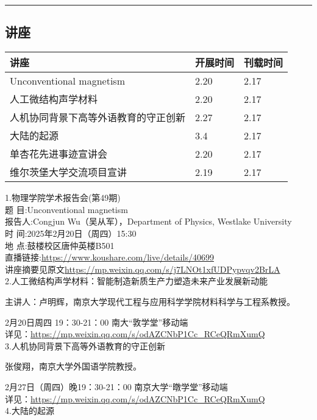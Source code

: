 \documentclass[letterpaper, 12pt]{article}
\begin{document}
\hrule
\pagebreak
\begin{multicols}{2}

\section{讲座}
\begin{tabularx}{0.5\textwidth}{|X|X|X|}
    \hline
    讲座 & 开展时间 & 刊载时间\\
    \hline\hline
Unconventional magnetism & 2.20 & 2.17\\\hline
人工微结构声学材料 & 2.20 & 2.17\\\hline
人机协同背景下高等外语教育的守正创新 & 2.27 & 2.17\\\hline
大陆的起源 & 3.4 & 2.17\\\hline
单杏花先进事迹宣讲会 & 2.20 & 2.17\\\hline
维尔茨堡大学交流项目宣讲 & 2.19 & 2.17\\\hline
\end{tabularx}

1.物理学院学术报告会(第49期)\\
题 目:Unconventional magnetism\\
报告人:Congjun Wu（吴从军），Department of Physics, Westlake University\\
时 间:2025年2月20日（周四）15:30\\
地 点:鼓楼校区唐仲英楼B501\\
直播链接:\url{https://www.koushare.com/live/details/40699}\\
讲座摘要见原文\url{https://mp.weixin.qq.com/s/j7LNOt1xfUDPypvqv2BrLA}\\

2.人工微结构声学材料：智能制造新质生产力塑造未来产业发展新动能

主讲人：卢明辉，南京大学现代工程与应用科学学院材料科学与工程系教授。

2月20日周四 19：30-21：00 南大“敦学堂”移动端\\
详见：\url{https://mp.weixin.qq.com/s/odAZCNbP1Cc_RCeQRmXumQ}\\

3.人机协同背景下高等外语教育的守正创新

张俊翔，南京大学外国语学院教授。

2月27日（周四）晚19：30-21：00 南京大学“暾学堂”移动端\\
详见：\url{https://mp.weixin.qq.com/s/odAZCNbP1Cc_RCeQRmXumQ}\\

4.大陆的起源


\end{multicols}
\end{document}
